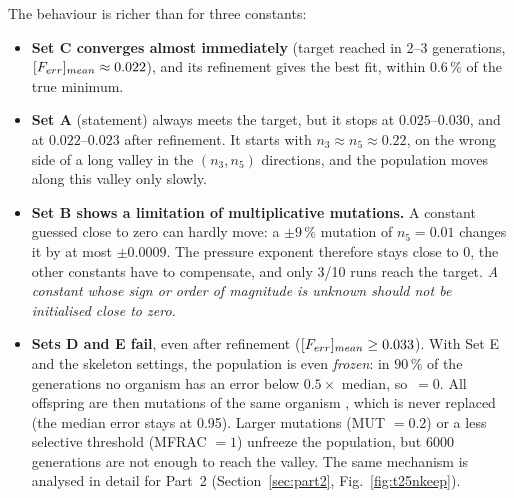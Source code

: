 The behaviour is richer than for three constants:
\begin{itemize}
  \item \textbf{Set C converges almost immediately} (target reached in 2--3 generations, $[F_{err}]_{mean}\approx0.022$),
        and its refinement gives the best fit, within $0.6\,\%$ of the true minimum.
  \item \textbf{Set A} (statement) always meets the target, but it stops at $0.025$--$0.030$, and at
        $0.022$--$0.023$ after refinement. It starts with $n_3\approx n_5\approx0.22$, on the wrong
        side of a long valley in the $(n_3,n_5)$ directions, and the population moves along this valley only
        slowly.
  \item \textbf{Set B shows a limitation of multiplicative mutations.} A constant guessed close to zero
        can hardly move: a $\pm9\,\%$ mutation of $n_5=0.01$ changes it by at most $\pm0.0009$. The
        pressure exponent therefore stays close to 0, the other constants have to compensate, and only
        3/10 runs reach the target. \emph{A constant whose sign or order of magnitude is unknown should not
        be initialised close to zero.}
  \item \textbf{Sets D and E fail}, even after refinement ($[F_{err}]_{mean}\ge0.033$). With Set E and the skeleton
        settings, the population is even \emph{frozen}: in $90\,\%$ of the generations no organism has an
        error below $0.5\times$ median, so $\,=0$. All offspring are then mutations of the same
        organism , which is never replaced (the median error stays at 0.95). Larger mutations
        (MUT $=0.2$) or a less selective threshold (MFRAC $=1$) unfreeze the population, but 6000
        generations are not enough to reach the valley. The same mechanism is analysed in detail for
        Part~2 (Section~\ref{sec:part2}, Fig.~\ref{fig:t25nkeep}).
\end{itemize}


